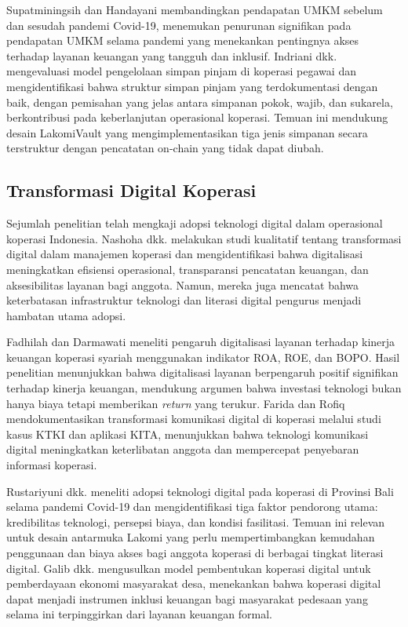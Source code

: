 Supatminingsih dan Handayani \cite{supatminingsih2025statistik} membandingkan pendapatan UMKM sebelum dan sesudah pandemi Covid-19, menemukan penurunan signifikan pada pendapatan UMKM selama pandemi yang menekankan pentingnya akses terhadap layanan keuangan yang tangguh dan inklusif. Indriani dkk. \cite{indriani2025model} mengevaluasi model pengelolaan simpan pinjam di koperasi pegawai dan mengidentifikasi bahwa struktur simpan pinjam yang terdokumentasi dengan baik, dengan pemisahan yang jelas antara simpanan pokok, wajib, dan sukarela, berkontribusi pada keberlanjutan operasional koperasi. Temuan ini mendukung desain LakomiVault yang mengimplementasikan tiga jenis simpanan secara terstruktur dengan pencatatan on-chain yang tidak dapat diubah.

\subsection{Transformasi Digital Koperasi}

Sejumlah penelitian telah mengkaji adopsi teknologi digital dalam operasional koperasi Indonesia. Nashoha dkk. \cite{nashoha2024transformasi} melakukan studi kualitatif tentang transformasi digital dalam manajemen koperasi dan mengidentifikasi bahwa digitalisasi meningkatkan efisiensi operasional, transparansi pencatatan keuangan, dan aksesibilitas layanan bagi anggota. Namun, mereka juga mencatat bahwa keterbatasan infrastruktur teknologi dan literasi digital pengurus menjadi hambatan utama adopsi.

Fadhilah dan Darmawati \cite{fadhilah2023transformasi} meneliti pengaruh digitalisasi layanan terhadap kinerja keuangan koperasi syariah menggunakan indikator ROA, ROE, dan BOPO. Hasil penelitian menunjukkan bahwa digitalisasi layanan berpengaruh positif signifikan terhadap kinerja keuangan, mendukung argumen bahwa investasi teknologi bukan hanya biaya tetapi memberikan \textit{return} yang terukur. Farida dan Rofiq \cite{farida2025peran} mendokumentasikan transformasi komunikasi digital di koperasi melalui studi kasus KTKI dan aplikasi KITA, menunjukkan bahwa teknologi komunikasi digital meningkatkan keterlibatan anggota dan mempercepat penyebaran informasi koperasi.

Rustariyuni dkk. \cite{rustariyuni2021pemanfaatan} meneliti adopsi teknologi digital pada koperasi di Provinsi Bali selama pandemi Covid-19 dan mengidentifikasi tiga faktor pendorong utama: kredibilitas teknologi, persepsi biaya, dan kondisi fasilitasi. Temuan ini relevan untuk desain antarmuka Lakomi yang perlu mempertimbangkan kemudahan penggunaan dan biaya akses bagi anggota koperasi di berbagai tingkat literasi digital. Galib dkk. \cite{galib2025penguatan} mengusulkan model pembentukan koperasi digital untuk pemberdayaan ekonomi masyarakat desa, menekankan bahwa koperasi digital dapat menjadi instrumen inklusi keuangan bagi masyarakat pedesaan yang selama ini terpinggirkan dari layanan keuangan formal.

